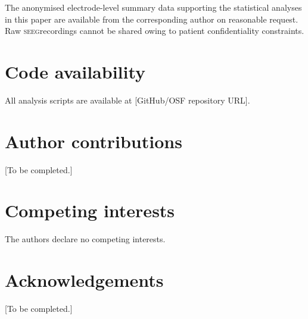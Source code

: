 \documentclass[11pt, a4paper]{article}
\newcommand{\seeg}{\textsc{seeg}}
\begin{document}
The anonymised electrode-level summary data supporting the statistical
analyses in this paper are available from the corresponding author on
reasonable request. Raw \seeg recordings cannot be shared owing to patient
confidentiality constraints.

\section*{Code availability}

All analysis scripts are available at [GitHub/OSF repository URL].

\section*{Author contributions}

[To be completed.]

\section*{Competing interests}

The authors declare no competing interests.

\section*{Acknowledgements}

[To be completed.]




\clearpage

\clearpage


\clearpage
\end{document}
